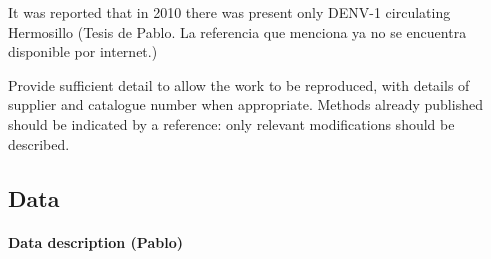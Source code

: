 It was reported that in 2010 there was present only DENV-1 circulating
Hermosillo (Tesis de Pablo. La referencia que menciona ya no se encuentra
disponible por internet.)  

Provide sufficient detail to allow the work to be 
reproduced, with details of supplier and catalogue 
number when appropriate. Methods already published 
should be indicated by a reference: only relevant 
modifications should be described.
\subsection{Data}
    \paragraph{Data description (Pablo)}
